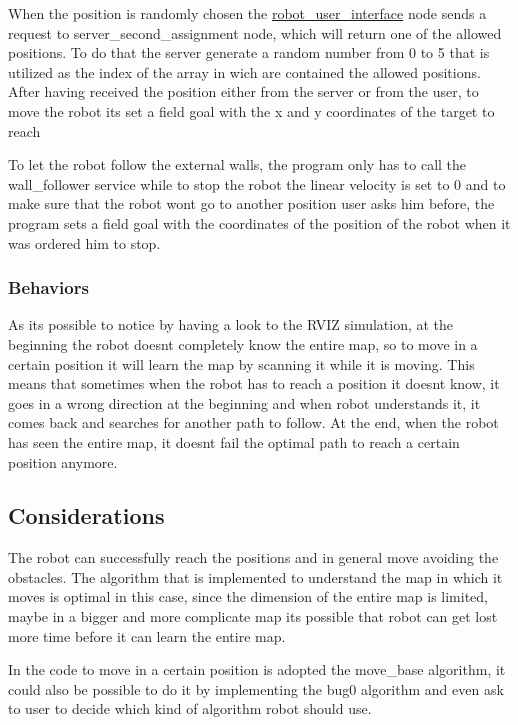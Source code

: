 When the position is randomly chosen the \hyperlink{namespacerobot__user__interface}{robot\+\_\+user\+\_\+interface} node sends a request to server\+\_\+second\+\_\+assignment node, which will return one of the allowed positions. To do that the server generate a random number from 0 to 5 that is utilized as the index of the array in wich are contained the allowed positions. After having received the position either from the server or from the user, to move the robot it\textquotesingle{}s set a field goal with the x and y coordinates of the target to reach

To let the robot follow the external walls, the program only has to call the wall\+\_\+follower service while to stop the robot the linear velocity is set to 0 and to make sure that the robot won\textquotesingle{}t go to another position user asks him before, the program sets a field goal with the coordinates of the position of the robot when it was ordered him to stop.

\subsubsection*{Behaviors}

As it\textquotesingle{}s possible to notice by having a look to the R\+V\+IZ simulation, at the beginning the robot doesn\textquotesingle{}t completely know the entire map, so to move in a certain position it will learn the map by scanning it while it is moving. This means that sometimes when the robot has to reach a position it doesn\textquotesingle{}t know, it goes in a wrong direction at the beginning and when robot understands it, it comes back and searches for another path to follow. At the end, when the robot has seen the entire map, it doesn\textquotesingle{}t fail the optimal path to reach a certain position anymore.

\subsection*{Considerations}

The robot can successfully reach the positions and in general move avoiding the obstacles. The algorithm that is implemented to understand the map in which it moves is optimal in this case, since the dimension of the entire map is limited, maybe in a bigger and more complicate map it\textquotesingle{}s possible that robot can get lost more time before it can learn the entire map.

In the code to move in a certain position is adopted the move\+\_\+base algorithm, it could also be possible to do it by implementing the bug0 algorithm and even ask to user to decide which kind of algorithm robot should use.

